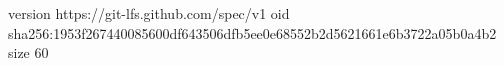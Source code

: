 version https://git-lfs.github.com/spec/v1
oid sha256:1953f267440085600df643506dfb5ee0e68552b2d5621661e6b3722a05b0a4b2
size 60
